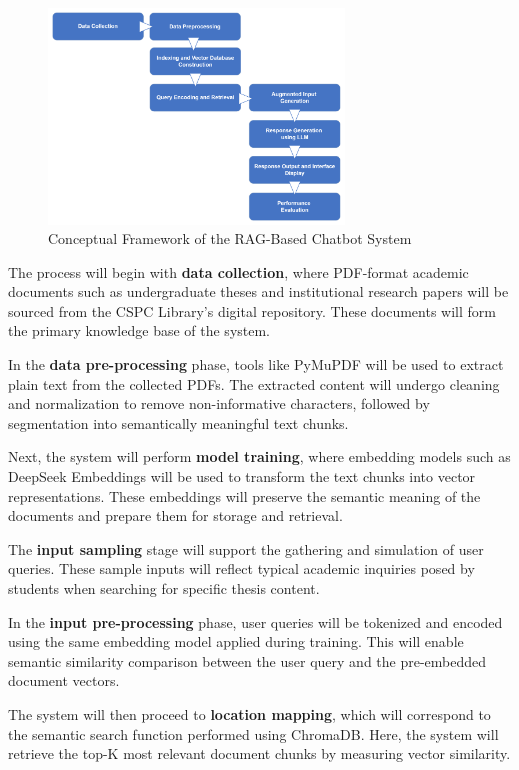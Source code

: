 \begin{refsection}
\begin{figure}[H]
    \centering
    \includegraphics[width=0.7\textwidth]{figures/framework.png}
    \caption{Conceptual Framework of the RAG-Based Chatbot System}
    \label{fig:conceptual_framework}
\end{figure}

The process will begin with \textbf{data collection}, where PDF-format academic documents such as undergraduate theses and institutional research papers will be sourced from the CSPC Library’s digital repository. These documents will form the primary knowledge base of the system.

In the \textbf{data pre-processing} phase, tools like PyMuPDF will be used to extract plain text from the collected PDFs. The extracted content will undergo cleaning and normalization to remove non-informative characters, followed by segmentation into semantically meaningful text chunks.

Next, the system will perform \textbf{model training}, where embedding models such as DeepSeek Embeddings will be used to transform the text chunks into vector representations. These embeddings will preserve the semantic meaning of the documents and prepare them for storage and retrieval.

The \textbf{input sampling} stage will support the gathering and simulation of user queries. These sample inputs will reflect typical academic inquiries posed by students when searching for specific thesis content.

In the \textbf{input pre-processing} phase, user queries will be tokenized and encoded using the same embedding model applied during training. This will enable semantic similarity comparison between the user query and the pre-embedded document vectors.

The system will then proceed to \textbf{location mapping}, which will correspond to the semantic search function performed using ChromaDB. Here, the system will retrieve the top-K most relevant document chunks by measuring vector similarity.


\end{refsection}
